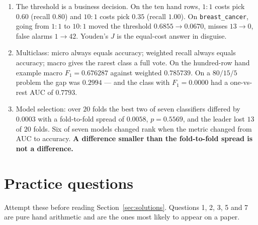 \documentclass[11pt]{article}
\begin{document}
\begin{enumerate}[leftmargin=*]
    $1156$ false alarms for $54$ true ones and one alert in twenty-two is real.
    The PR baseline is the prevalence, not $0.5$.
  \item The threshold is a business decision. On the ten hand rows, $1\!:\!1$
    costs pick $0.60$ (recall $0.80$) and $10\!:\!1$ costs pick $0.35$ (recall
    $1.00$). On \texttt{breast\_cancer}, going from $1\!:\!1$ to $10\!:\!1$ moved
    the threshold $0.6855 \to 0.0670$, misses $13 \to 0$, false alarms $1 \to 42$.
    Youden's $J$ is the equal-cost answer in disguise.
  \item Multiclass: micro always equals accuracy; weighted recall always equals
    accuracy; macro gives the rarest class a full vote. On the hundred-row hand
    example macro $F_1 = 0.676287$ against weighted $0.785739$. On a $80/15/5$
    problem the gap was $0.2994$ --- and the class with $F_1 = 0.0000$ had a
    one-vs-rest AUC of $0.7793$.
  \item Model selection: over $20$ folds the best two of seven classifiers
    differed by $0.0003$ with a fold-to-fold spread of $0.0058$, $p = 0.5569$,
    and the leader lost $13$ of $20$ folds. Six of seven models changed rank when
    the metric changed from AUC to accuracy. \textbf{A difference smaller than
    the fold-to-fold spread is not a difference.}
\end{enumerate}

\section{Practice questions}

Attempt these before reading Section~\ref{sec:solutions}. Questions 1, 2, 3, 5
and 7 are pure hand arithmetic and are the ones most likely to appear on a paper.
\end{document}
